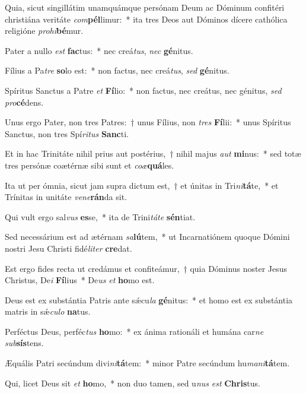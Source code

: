 \item Quia, sicut singillátim unamquámque persónam Deum ac Dóminum confitéri christiána veritáte \textit{com}\textbf{pél}limur:~* ita tres Deos aut Dóminos dícere cathólica religióne \textit{pro}\textit{hi}\textbf{bé}mur.
\item Pater a nullo \textit{est} \textbf{fac}tus:~* nec creá\textit{tus}, \textit{nec} \textbf{gé}nitus.
\item Fílius a Pa\textit{tre} \textbf{so}lo est:~* non factus, nec creá\textit{tus}, \textit{sed} \textbf{gé}nitus.
\item Spíritus Sanctus a Patre \textit{et} \textbf{Fí}lio:~* non factus, nec creátus, nec génitus, \textit{sed} \textit{pro}\textbf{cé}dens.
\item Unus ergo Pater, non tres Patres:~† unus Fílius, non \textit{tres} \textbf{Fí}lii:~* unus Spíritus Sanctus, non tres Spí\textit{ri}\textit{tus} \textbf{Sanc}ti.
\item Et in hac Trinitáte nihil prius aut postérius,~† nihil majus \textit{aut} \textbf{mi}nus:~* sed totæ tres persónæ coætérnæ sibi sunt et \textit{co}\textit{æ}\textbf{quá}les.
\item Ita ut per ómnia, sicut jam supra dictum est,~† et únitas in Tri\textit{ni}\textbf{tá}te,~* et Trínitas in unitáte \textit{ve}\textit{ne}\textbf{rán}da sit.
\item Qui vult ergo sal\textit{vus} \textbf{es}se,~* ita de Trini\textit{tá}\textit{te} \textbf{sén}tiat.
\item Sed necessárium est ad ætérnam \textit{sa}\textbf{lú}tem,~* ut Incarnatiónem quoque Dómini nostri Jesu Christi fidé\textit{li}\textit{ter} \textbf{cre}dat.
\item Est ergo fides recta ut credámus et confiteámur,~† quia Dóminus noster Jesus Christus, De\textit{i} \textbf{Fí}lius~* De\textit{us} \textit{et} \textbf{ho}mo est.
\item Deus est ex substántia Patris ante sǽcu\textit{la} \textbf{gé}nitus:~* et homo est ex substántia matris in sǽ\textit{cu}\textit{lo} \textbf{na}tus.
\item Perféctus Deus, perféc\textit{tus} \textbf{ho}mo:~* ex ánima rationáli et humána car\textit{ne} \textit{sub}\textbf{sís}tens.
\item Æquális Patri secúndum divi\textit{ni}\textbf{tá}tem:~* minor Patre secúndum hu\textit{ma}\textit{ni}\textbf{tá}tem.
\item Qui, licet Deus sit \textit{et} \textbf{ho}mo,~* non duo tamen, sed u\textit{nus} \textit{est} \textbf{Chris}tus.
